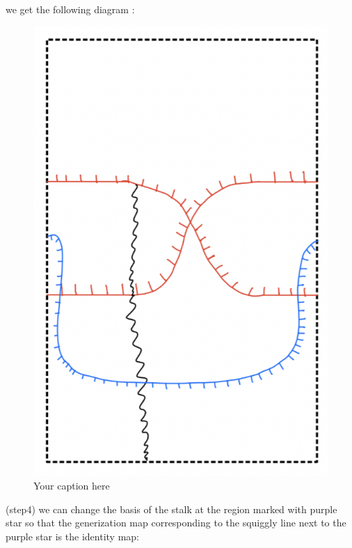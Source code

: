 we get the following diagram :
\begin{figure}[H] %
    \centering
    \includegraphics[scale=0.95]{diagrams/lemma9/8.png} %
    \caption{Your caption here}
    \label{fig:your-label}
\end{figure}

(step4) we can change the basis of the stalk at the region marked with purple star so that the generization map corresponding to the squiggly line next to the purple star is the identity map:

